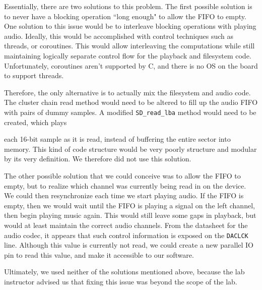 \documentclass[12pt]{article}
\begin{document}

Essentially, there are two solutions to this problem.
The first possible solution is to never have a blocking operation ``long enough"
to allow the FIFO to empty.
One solution to this issue would be to interleave blocking operations with playing
audio.
Ideally, this would be accomplished with control techniques such as threads, or
coroutines.
This would allow interleaving the computations while still maintaining logically
separate control flow for the playback and filesystem code.
Unfortunately, coroutines aren't supported by C, and there is no OS on the board
to support threads.

Therefore, the only alternative is to actually mix the filesystem and audio code.
The cluster chain read method would need to be altered to fill up the audio FIFO
with pairs of dummy samples.
A modified \texttt{SD\_read\_lba} method would need to be created, which plays

each 16-bit sample as it is read, instead of buffering the entire sector into
memory.
This kind of code structure would be very poorly structure and modular by its
very definition.
We therefore did not use this solution.

The other possible solution that we could conceive was to allow the FIFO to
empty, but to realize which channel was currently being read in on the device.
We could then resynchronize each time we start playing audio.
If the FIFO is empty, then we would wait until the FIFO is playing a signal on
the left channel, then begin playing music again.
This would still leave some gaps in playback, but would at least maintain
the correct audio channels.
From the datasheet for the audio codec, it appears that such control information
is exposed on the \texttt{DACLCK} line.
Although this value is currently not read, we could create a new parallel IO pin
to read this value, and make it accessible to our software.

Ultimately, we used neither of the solutions mentioned above, because the lab
instructor advised us that fixing this issue was beyond the scope of the lab.
\end{document}
